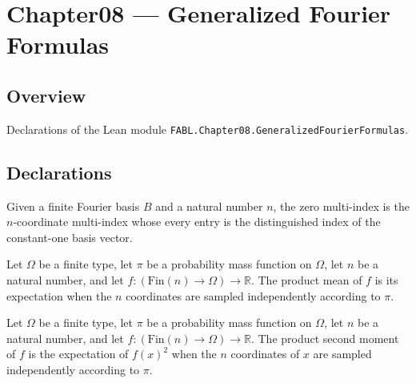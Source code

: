 \chapter{Chapter08 — Generalized Fourier Formulas}
\section{Overview}

Declarations of the Lean module \texttt{FABL.Chapter08.GeneralizedFourierFormulas}.

\section{Declarations}

\begin{definition}
\label{FABL.FiniteFourierBasis.zeroMultiIndex}
\leanok
{}
Given a finite Fourier basis $B$ and a natural number $n$, the zero multi-index is the
$n$-coordinate multi-index whose every entry is the distinguished index of the
constant-one basis vector.
\end{definition}

\begin{definition}
\label{FABL.productMean}
\leanok
{}
Let $\Omega$ be a finite type, let $\pi$ be a probability mass function on $\Omega$, let
$n$ be a natural number, and let $f:(\mathrm{Fin}(n)\to\Omega)\to\mathbb{R}$. The
product mean of $f$ is its expectation when the $n$ coordinates are sampled
independently according to $\pi$.
\end{definition}

\begin{definition}
\label{FABL.productSecondMoment}
\leanok
{}
Let $\Omega$ be a finite type, let $\pi$ be a probability mass function on $\Omega$, let
$n$ be a natural number, and let $f:(\mathrm{Fin}(n)\to\Omega)\to\mathbb{R}$. The
product second moment of $f$ is the expectation of $f(x)^2$ when the $n$ coordinates of
$x$ are sampled independently according to $\pi$.
\end{definition}

